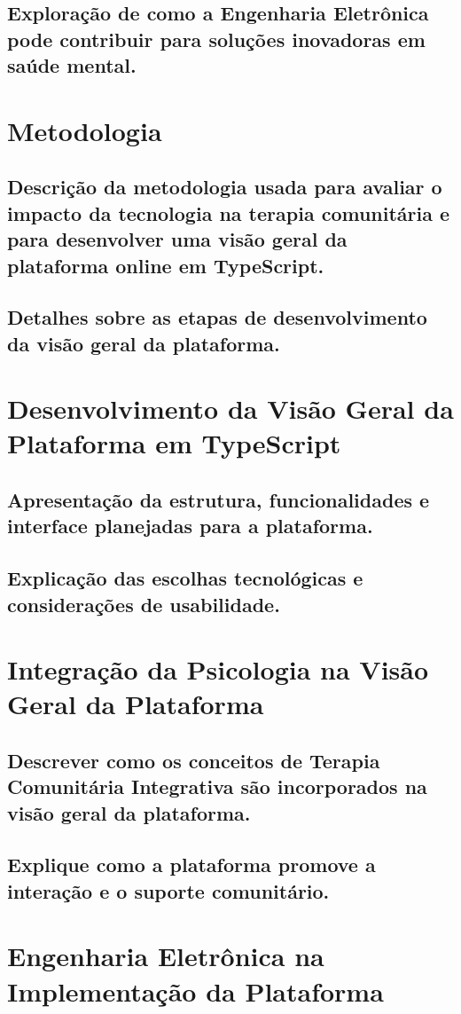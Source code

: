 \subsection{Exploração de como a Engenharia Eletrônica pode contribuir para soluções inovadoras em saúde mental.}
\section{Metodologia}
\subsection{Descrição da metodologia usada para avaliar o impacto da tecnologia na terapia comunitária e para desenvolver uma visão geral da plataforma online em TypeScript.}
\subsection{Detalhes sobre as etapas de desenvolvimento da visão geral da plataforma.}
\section{Desenvolvimento da Visão Geral da Plataforma em TypeScript}
\subsection{Apresentação da estrutura, funcionalidades e interface planejadas para a plataforma.}
\subsection{Explicação das escolhas tecnológicas e considerações de usabilidade.}
\section{Integração da Psicologia na Visão Geral da Plataforma}
\subsection{Descrever como os conceitos de Terapia Comunitária Integrativa são incorporados na visão geral da plataforma.}
\subsection{Explique como a plataforma promove a interação e o suporte comunitário.}
\section{Engenharia Eletrônica na Implementação da Plataforma}
